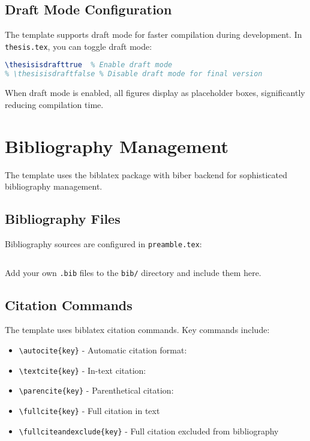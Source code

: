 \subsection{Draft Mode Configuration}
\label{sect:draft-mode}

The template supports draft mode for faster compilation during development. In \texttt{thesis.tex}, you can toggle draft mode:

\begin{lstlisting}[language=TeX,caption={Draft mode toggle in thesis.tex}]
% Toggle draft mode - figures show as placeholder boxes
\thesisisdrafttrue  % Enable draft mode
% \thesisisdraftfalse % Disable draft mode for final version
\end{lstlisting}

When draft mode is enabled, all figures display as placeholder boxes, significantly reducing compilation time.

\section{Bibliography Management}
\label{sect:bibliography}

The template uses the biblatex package with biber backend for sophisticated bibliography management.

\subsection{Bibliography Files}
\label{sect:bib-files}

Bibliography sources are configured in \texttt{preamble.tex}:

\begin{lstlisting}[language=TeX,caption={Bibliography configuration}]


\end{lstlisting}

Add your own \texttt{.bib} files to the \texttt{bib/} directory and include them here.

\subsection{Citation Commands}
\label{sect:citations}

The template uses biblatex citation commands. Key commands include:

\begin{itemize}
    \item \texttt{\textbackslash autocite\{key\}} - Automatic citation format: \autocite{yourname2024nature}
    \item \texttt{\textbackslash textcite\{key\}} - In-text citation: \textcite{yourname2024nature}
    \item \texttt{\textbackslash parencite\{key\}} - Parenthetical citation: \parencite{yourname2024nature}
    \item \texttt{\textbackslash fullcite\{key\}} - Full citation in text
    \item \texttt{\textbackslash fullciteandexclude\{key\}} - Full citation excluded from bibliography
\end{itemize}

